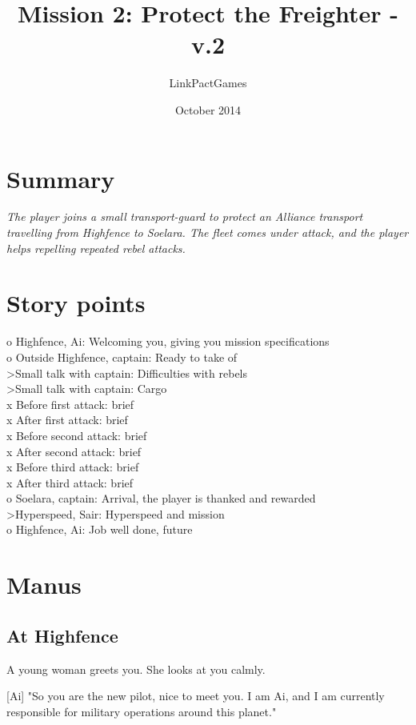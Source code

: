 \documentclass[a4paper,12pt]{article}
\begin{document}
\title{Mission 2: Protect the Freighter - v.2}
\author{LinkPactGames}
\date{October 2014}
\maketitle

\section{Summary}
\textit{The player joins a small transport-guard to protect an Alliance
transport travelling from Highfence to Soelara. The fleet comes under attack,
and the player helps repelling repeated rebel attacks.}

\section{Story points}
o Highfence, Ai: Welcoming you, giving you mission specifications\\
o Outside Highfence, captain: Ready to take of\\
\textgreater Small talk with captain: Difficulties with rebels\\
\textgreater Small talk with captain: Cargo\\
x Before first attack: brief\\
x After first attack: brief\\
x Before second attack: brief\\
x After second attack: brief\\
x Before third attack: brief\\
x After third attack: brief\\
o Soelara, captain: Arrival, the player is thanked and rewarded\\
\textgreater Hyperspeed, Sair: Hyperspeed and mission\\
o Highfence, Ai: Job well done, future

\section{Manus}

\subsection{At Highfence}

A young woman greets you. She looks at you calmly. 

[Ai] "So you are the new pilot, nice to meet you. I am Ai, and I am currently
responsible for military operations around this planet."
\end{document}

